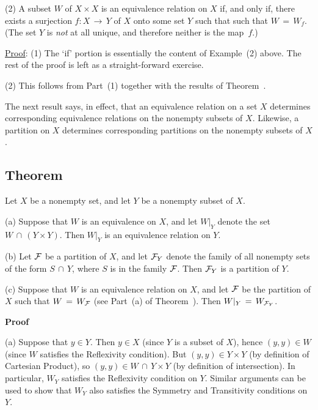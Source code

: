 {\V

        (2) A subset $W$ of $X{\times}X$ is an equivalence relation on $X$ if, and only if,
    there exists a surjection $f:X \,{\rightarrow}\, Y$ of $X$ onto some set $Y$ such that such that $W \,=\, W_{f}$.
    (The set $Y$ is {\em not} at all unique, and therefore neither is the map~$f$.)

\V

        \underline{Proof}: (1) The `if' portion is essentially the content of Example~(2) above.
    The rest of the proof is left as a straight-forward exercise.

\V

        (2) This follows from Part~(1) together with the results of Theorem~.

 
      The next result says, in effect, that an equivalence relation on a set $X$ determines corresponding equivalence relations on the nonempty subsets of $X$.
    Likewise, a partition on $X$ determines corresponding partitions on the nonempty subsets of $X$.

\V

        \subsection{\small{{\bf Theorem}}}
                \label{ThmA50.115}

        Let $X$ be a nonempty set, and let $Y$ be a nonempty subset of $X$.

\V

        (a) Suppose that $W$ is an equivalence on $X$, and let $W|_{Y}$ denote the set $W\,{\cap}\,(Y{\times}Y)$.
    Then $W|_{Y}$ is an equivalence relation on $Y$.

\V

        (b) Let ${\cal F}$ be a partition of $X$, and let ${\cal F}_{Y}$ denote the family of all nonempty sets of the form $S\,{\cap}\,Y$, where $S$ is in the family ${\cal F}$.
    Then ${\cal F}_{Y}$ is a partition of $Y$.

\V

        (c) Suppose that $W$ is an equivalence relation on $X$, and let ${\cal F}$ be the partition of $X$ such that $W \,=\, W_{{\cal F}}$
    (see Part~(a) of Theorem~).
    Then $W|_{Y} \,=\, W_{{\cal F}_{Y}}$.

\V

        {\bf Proof}\, 

\V

        (a) Suppose that $y{\in}Y$.
    Then $y{\in}X$ (since $Y$ is a subset of $X$), hence $(y,y){\in}W$ (since $W$ satisfies the Reflexivity condition).
    But $(y,y){\in}Y{\times}Y$ (by definition of Cartesian Product), so $(y,y){\in}W\,{\cap}\,Y{\times}Y$ (by definition of intersection).
    In particular, $W_{Y}$ satisfies the Reflexivity condition on $Y$.
    Similar arguments can be used to show that $W_{Y}$ also satisfies the Symmetry and Transitivity conditions on $Y$.

}
